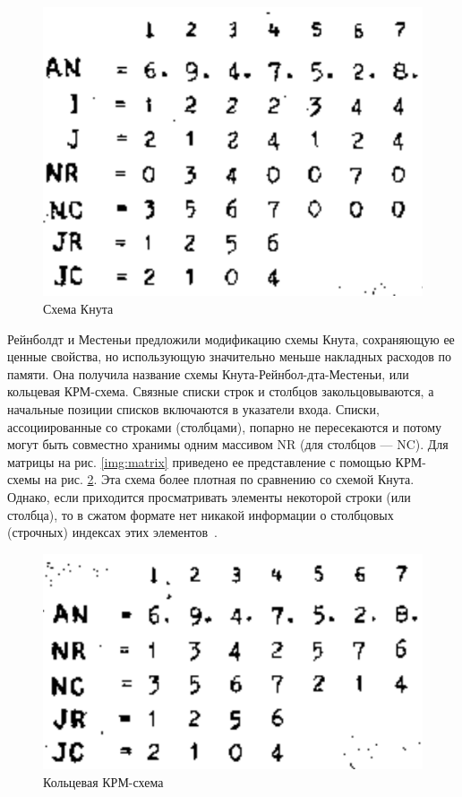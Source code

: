 \begin{figure}[H]
	\begin{center}
		\includegraphics[scale=0.7]{img/knuth.png}
	\end{center}
	\captionsetup{justification=centering}
	\caption{Схема Кнута}
	\label{img:knuth}
\end{figure}

Рейнболдт и Местеньи предложили модификацию схемы Кнута, сохраняющую ее ценные свойства, но использующую значительно меньше накладных расходов по памяти. Она получила название схемы Кнута-Рейнбол-дта-Местеньи, или кольцевая КРМ-схема. Связные списки строк и столбцов закольцовываются, а начальные позиции списков включаются в указатели входа. Списки, ассоциированные со строками (столбцами), попарно не пересекаются и потому могут быть совместно хранимы одним массивом NR (для столбцов --- NC). Для матрицы на рис. \ref{img:matrix} \cite{tads} приведено ее представление с помощью КРМ-схемы на рис. \ref{img:krm}. Эта схема более плотная по сравнению со схемой Кнута. Однако, если приходится просматривать элементы некоторой строки (или столбца), то в сжатом формате нет никакой информации о столбцовых (строчных) индексах этих элементов~\cite{krm}.

\begin{figure}[H]
	\begin{center}
		\includegraphics[scale=0.7]{img/krm.png}
	\end{center}
	\captionsetup{justification=centering}
	\caption{Кольцевая КРМ-схема}
	\label{img:krm}
\end{figure}

